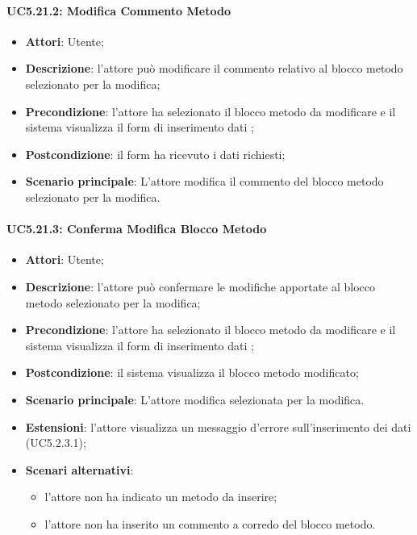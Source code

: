 \paragraph{UC5.21.2: Modifica Commento Metodo}
\label{UC5.21.2}
\begin{itemize}
	\item \textbf{Attori}: Utente;
	\item \textbf{Descrizione}: l'attore può modificare il commento relativo al blocco metodo selezionato per la modifica;
	\item \textbf{Precondizione}: l'attore ha selezionato il blocco metodo da modificare e il sistema visualizza il form di inserimento dati ;
	\item \textbf{Postcondizione}: il form ha ricevuto i dati richiesti;
	\item \textbf{Scenario principale}: L'attore modifica il commento del blocco metodo selezionato per la modifica.
\end{itemize}

\paragraph{UC5.21.3: Conferma Modifica Blocco Metodo}
\label{UC5.21.3}
\begin{itemize}
	\item \textbf{Attori}: Utente;
	\item \textbf{Descrizione}: l'attore può confermare le modifiche apportate al blocco metodo selezionato per la modifica;
	\item \textbf{Precondizione}: l'attore ha selezionato il blocco metodo da modificare e il sistema visualizza il form di inserimento dati ;
	\item \textbf{Postcondizione}: il sistema visualizza il blocco metodo modificato;
	\item \textbf{Scenario principale}: L'attore modifica  selezionata per la modifica.
	\item \textbf{Estensioni}: l'attore visualizza un messaggio d'errore sull'inserimento dei dati (UC5.2.3.1);
	\item \textbf{Scenari alternativi}:
	\begin{itemize}
		\item l'attore non ha indicato un metodo da inserire;
		\item l'attore non ha inserito un commento a corredo del blocco metodo.
	\end{itemize}
\end{itemize}


